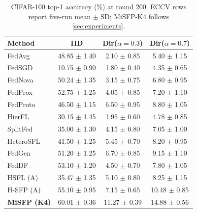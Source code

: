\begin{table}[t]
\caption{CIFAR-100 top-1 accuracy (\%) at round 200. ECCV rows report five-run mean $\pm$ SD; MiSFP-K4 follows \cref{sec:experiments}.}
\label{tab:reference}
\centering\footnotesize
\setlength{\tabcolsep}{2.5pt}
\begin{tabular*}{\columnwidth}{@{\extracolsep{\fill}}lccc@{}}\toprule
Method & IID & Dir($\alpha{=}0.3$) & Dir($\alpha{=}0.7$)\\\midrule
FedAvg & 48.85 {\scriptsize $\pm$ 1.40} & 2.10 {\scriptsize $\pm$ 0.85} & 5.40 {\scriptsize $\pm$ 1.15}\\
FedSGD & 10.75 {\scriptsize $\pm$ 0.90} & 1.80 {\scriptsize $\pm$ 0.40} & 4.35 {\scriptsize $\pm$ 0.65}\\
FedNova & 50.24 {\scriptsize $\pm$ 1.35} & 3.15 {\scriptsize $\pm$ 0.75} & 6.80 {\scriptsize $\pm$ 0.95}\\
FedProx & 52.75 {\scriptsize $\pm$ 1.25} & 4.05 {\scriptsize $\pm$ 0.85} & 7.20 {\scriptsize $\pm$ 1.10}\\
FedProto & 46.50 {\scriptsize $\pm$ 1.15} & 6.50 {\scriptsize $\pm$ 0.95} & 8.80 {\scriptsize $\pm$ 1.05}\\
HierFL & 30.15 {\scriptsize $\pm$ 1.45} & 1.95 {\scriptsize $\pm$ 0.60} & 4.78 {\scriptsize $\pm$ 0.85}\\
SplitFed & 35.00 {\scriptsize $\pm$ 1.30} & 4.15 {\scriptsize $\pm$ 0.80} & 7.05 {\scriptsize $\pm$ 1.00}\\
HeteroSFL & 41.50 {\scriptsize $\pm$ 1.25} & 5.45 {\scriptsize $\pm$ 0.70} & 8.20 {\scriptsize $\pm$ 0.95}\\
FedGen & 51.20 {\scriptsize $\pm$ 1.25} & 6.70 {\scriptsize $\pm$ 0.85} & 9.15 {\scriptsize $\pm$ 1.10}\\
FedDF & 53.10 {\scriptsize $\pm$ 1.20} & 4.50 {\scriptsize $\pm$ 0.70} & 7.80 {\scriptsize $\pm$ 1.05}\\
HSFL (A) & 35.47 {\scriptsize $\pm$ 1.35} & 5.10 {\scriptsize $\pm$ 0.80} & 8.25 {\scriptsize $\pm$ 1.15}\\
\midrule
H-SFP (A) & 55.10 {\scriptsize $\pm$ 0.95} & 7.15 {\scriptsize $\pm$ 0.65} & 10.48 {\scriptsize $\pm$ 0.85}\\
\textbf{MiSFP (K4)} & 60.01 {\scriptsize $\pm$ 0.36} & 11.27 {\scriptsize $\pm$ 0.39} & 14.88 {\scriptsize $\pm$ 0.56}\\
\bottomrule\end{tabular*}
\end{table}

